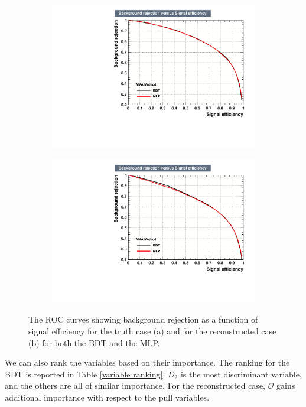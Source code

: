 \documentclass[10pt,a4paper]{book}
\begin{document}
\begin{figure}[h]
\begin{subfigure}{1.0\textwidth}
\centering
\includegraphics[scale=0.65]{ch4_images/roc_truth}
\caption{}
\end{subfigure}
\begin{subfigure}{1.0\textwidth}
\centering
\includegraphics[scale=0.65]{ch4_images/roc_reco.pdf}
\caption{}
\end{subfigure}
\caption{The ROC curves showing background rejection as a function of signal efficiency for the truth case (a) and for the reconstructed case (b) for both the BDT and the MLP.}
\label{ROC curves}
\end{figure} 

We can also rank the variables based on their importance. The ranking for the BDT is reported in Table \ref{variable ranking}. $D_2$ is the most discriminant variable, and the others are all of similar importance. For the reconstructed case, $\mathcal{O}$ gains additional importance with respect to the pull variables.
\end{document}
